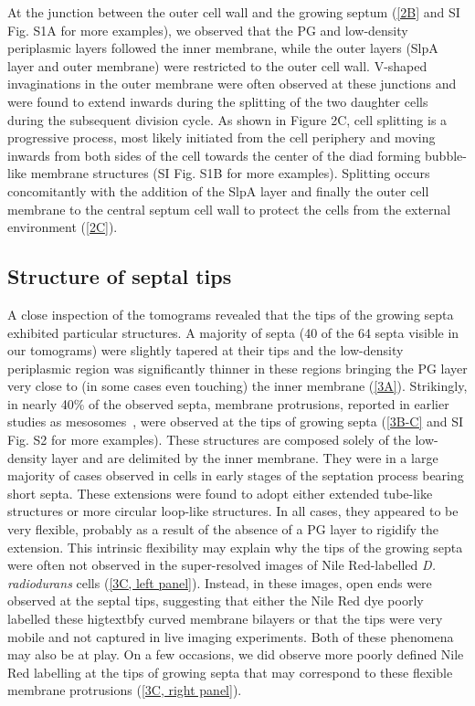 At the junction between the outer cell wall and the growing septum (\autoref{2B} and SI Fig. S1A for more examples), we observed that the PG and low-density periplasmic layers followed the inner membrane, while the outer layers (SlpA layer and outer membrane) were restricted to the outer cell wall.
V-shaped invaginations in the outer membrane were often observed at these junctions and were found to extend inwards during the splitting of the two daughter cells during the subsequent division cycle.
As shown in Figure 2C, cell splitting is a progressive process, most likely initiated from the cell periphery and moving inwards from both sides of the cell towards the center of the diad forming bubble-like membrane structures (SI Fig. S1B for more examples).
Splitting occurs concomitantly with the addition of the SlpA layer and finally the outer cell membrane to the central septum cell wall to protect the cells from the external environment (\autoref{2C}).

\subsection{Structure of septal tips}

A close inspection of the tomograms revealed that the tips of the growing septa exhibited particular structures.
A majority of septa (40 of the 64 septa visible in our tomograms) were slightly tapered at their tips and the low-density periplasmic region was significantly thinner in these regions bringing the PG layer very close to (in some cases even touching) the inner membrane (\autoref{3A}).
Strikingly, in nearly 40\% of the observed septa, membrane protrusions, reported in earlier studies as mesosomes~\cite{thornleyFineStructureMicrococcus1965,sleytrStudyFreezeetchingFine1973}, were observed at the tips of growing septa (\autoref{3B-C} and SI Fig. S2 for more examples).
These structures are composed solely of the low-density layer and are delimited by the inner membrane.
They were in a large majority of cases observed in cells in early stages of the septation process bearing short septa.
These extensions were found to adopt either extended tube-like structures or more circular loop-like structures.
In all cases, they appeared to be very flexible, probably as a result of the absence of a PG layer to rigidify the extension.
This intrinsic flexibility may explain why the tips of the growing septa were often not observed in the super-resolved images of Nile Red-labelled \textit{D. radiodurans} cells (\autoref{3C, left panel}).
Instead, in these images, open ends were observed at the septal tips, suggesting that either the Nile Red dye poorly labelled these higtextbfy curved membrane bilayers or that the tips were very mobile and not captured in live imaging experiments.
Both of these phenomena may also be at play.
On a few occasions, we did observe more poorly defined Nile Red labelling at the tips of growing septa that may correspond to these flexible membrane protrusions (\autoref{3C, right panel}).

